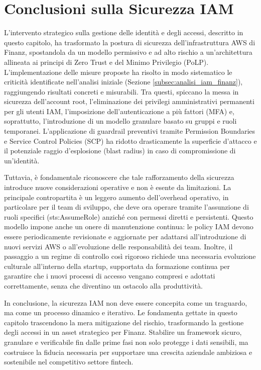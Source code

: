 \section{Conclusioni sulla Sicurezza IAM}
L'intervento strategico sulla gestione delle identità e degli accessi, descritto in questo capitolo, ha trasformato la postura di sicurezza dell'infrastruttura AWS di Finanz, spostandola da un modello permissivo e ad alto rischio a un'architettura allineata ai principi di Zero Trust e del Minimo Privilegio (PoLP). L'implementazione delle misure proposte ha risolto in modo sistematico le criticità identificate nell'analisi iniziale (Sezione \ref{subsec:analisi_iam_finanz}), raggiungendo risultati concreti e misurabili. Tra questi, spiccano la messa in sicurezza dell'account root, l'eliminazione dei privilegi amministrativi permanenti per gli utenti IAM, l'imposizione dell'autenticazione a più fattori (MFA) e, soprattutto, l'introduzione di un modello granulare basato su gruppi e ruoli temporanei. L'applicazione di guardrail preventivi tramite Permission Boundaries e Service Control Policies (SCP) ha ridotto drasticamente la superficie d'attacco e il potenziale raggio d'esplosione (blast radius) in caso di compromissione di un'identità.

Tuttavia, è fondamentale riconoscere che tale rafforzamento della sicurezza introduce nuove considerazioni operative e non è esente da limitazioni. La principale contropartita è un leggero aumento dell'overhead operativo, in particolare per il team di sviluppo, che deve ora operare tramite l'assunzione di ruoli specifici (sts:AssumeRole) anziché con permessi diretti e persistenti. Questo modello impone anche un onere di manutenzione continua: le policy IAM devono essere periodicamente revisionate e aggiornate per adattarsi all'introduzione di nuovi servizi AWS o all'evoluzione delle responsabilità dei team. Inoltre, il passaggio a un regime di controllo così rigoroso richiede una necessaria evoluzione culturale all'interno della startup, supportata da formazione continua per garantire che i nuovi processi di accesso vengano compresi e adottati correttamente, senza che diventino un ostacolo alla produttività.

In conclusione, la sicurezza IAM non deve essere concepita come un traguardo, ma come un processo dinamico e iterativo. Le fondamenta gettate in questo capitolo trascendono la mera mitigazione del rischio, trasformando la gestione degli accessi in un asset strategico per Finanz. Stabilire un framework sicuro, granulare e verificabile fin dalle prime fasi non solo protegge i dati sensibili, ma costruisce la fiducia necessaria per supportare una crescita aziendale ambiziosa e sostenibile nel competitivo settore fintech.